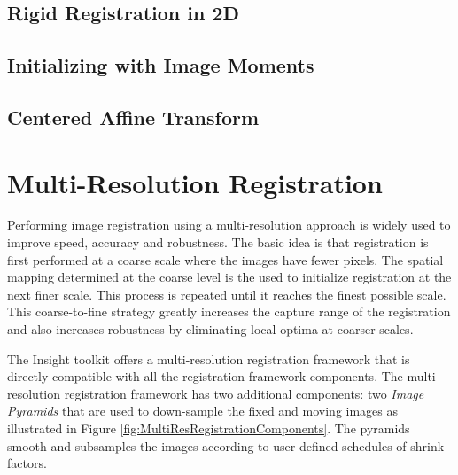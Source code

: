 \subsection{Rigid Registration in 2D}
\label{sec:RigidRegistrationIn2D}
\ifitkFullVersion

\fi

\subsection{Initializing with Image Moments}
\label{sec:InitializingRegistrationWithMoments}
\ifitkFullVersion

\fi



%



\subsection{Centered Affine Transform}
\label{sec:CenteredAffineTransform}
\ifitkFullVersion

\fi





\section{Multi-Resolution Registration}
\label{sec:MultiResolutionRegistration}
Performing image registration using a multi-resolution approach is widely used
to improve speed, accuracy and robustness. The basic idea is that registration
is first performed at a coarse scale where the images have fewer pixels.
The spatial mapping determined at the coarse level is the used to initialize
registration at the next finer scale. This process is repeated until it
reaches the finest possible scale. This coarse-to-fine strategy greatly
increases the capture range of the registration and also increases robustness
by eliminating local optima at coarser scales.

The Insight toolkit offers a multi-resolution registration framework that
is directly compatible with all the registration framework components. The
multi-resolution registration framework has two additional components:
two \emph{Image Pyramids} that are used to down-sample the fixed and moving
images as illustrated in Figure \ref{fig:MultiResRegistrationComponents}.
The pyramids smooth and subsamples the images according to user defined
schedules of shrink factors. 
 

